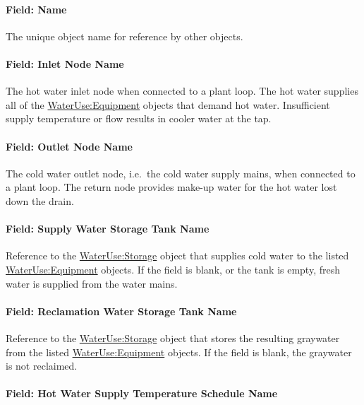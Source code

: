 \paragraph{Field: Name}\label{field-name-1-048}

The unique object name for reference by other objects.

\paragraph{Field: Inlet Node Name}\label{field-inlet-node-name-008}

The hot water inlet node when connected to a plant loop. The hot water supplies all of the \hyperref[wateruseequipment]{WaterUse:Equipment} objects that demand hot water. Insufficient supply temperature or flow results in cooler water at the tap.

\paragraph{Field: Outlet Node Name}\label{field-outlet-node-name-009}

The cold water outlet node, i.e.~the cold water supply mains, when connected to a plant loop. The return node provides make-up water for the hot water lost down the drain.

\paragraph{Field: Supply Water Storage Tank Name}\label{field-supply-water-storage-tank-name-002}

Reference to the \hyperref[waterusestorage]{WaterUse:Storage} object that supplies cold water to the listed \hyperref[wateruseequipment]{WaterUse:Equipment} objects. If the field is blank, or the tank is empty, fresh water is supplied from the water mains.

\paragraph{Field: Reclamation Water Storage Tank Name}\label{field-reclamation-water-storage-tank-name}

Reference to the \hyperref[waterusestorage]{WaterUse:Storage} object that stores the resulting graywater from the listed \hyperref[wateruseequipment]{WaterUse:Equipment} objects. If the field is blank, the graywater is not reclaimed.

\paragraph{Field: Hot Water Supply Temperature Schedule Name}\label{field-hot-water-supply-temperature-schedule-name-1}

